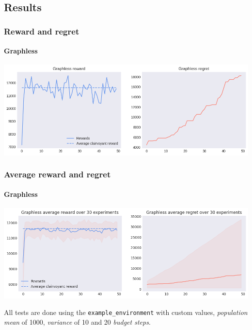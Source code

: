 
\subsection{Results}


\begin{frame}[plain]

\frametitle{Reward and regret}
\framesubtitle{Graphless}

\begin{center}
	\hspace*{-2.8em}
	\includegraphics[scale=0.5]{img/Graphs/graphless/image1.png}
\end{center}

\end{frame}


\begin{frame}[plain]

\frametitle{Average reward and regret}
\framesubtitle{Graphless}

\begin{center}
	\hspace*{-2.8em}
	\includegraphics[scale=0.5]{img/Graphs/graphless/image2.png}
\end{center}

\vspace*{2em}

\scriptsize All tests are done using the \texttt{example\_environment} with custom values, \textit{population mean} of 1000, \textit{variance} of 10 and 20 \textit{budget steps}.

\end{frame}

